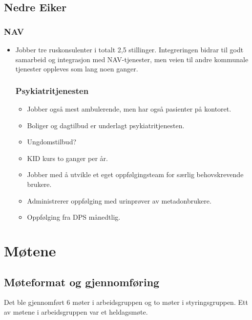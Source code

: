 \documentclass[11pt]{report} %
\begin{document}
                  \section{Nedre Eiker}\label{sec:org_nek}
                    \subsection{NAV}\label{sec:org_nek_nav}
                      \begin{itemize}
                      \item Jobber tre ruskonsulenter i totalt 2,5 stillinger. Integreringen bidrar til godt samarbeid og integrasjon med NAV-tjenester, men veien til andre kommunale tjenester oppleves som lang noen ganger. 
                    \subsection{Psykiatritjenesten}\label{sec:org_nek_psyk}  
                          \begin{itemize} 
                            \item Jobber også mest ambulerende, men har også pasienter på kontoret. 
                            \item Boliger og dagtilbud er underlagt psykiatritjenesten.
                            \item Ungdomstilbud?
                            \item KID kurs to ganger per år.
                            \item Jobber med å utvikle et eget oppfølgingsteam for særlig behovskrevende brukere. 
                            \item Administrerer oppfølging med urinprøver av metadonbrukere. 
                            \item Oppfølging fra DPS månedtlig.
                          \end{itemize}
                      \end{itemize}
                      



              \chapter{Møtene}\label{chap:m_main}
                \section{Møteformat og gjennomføring}\label{sec:m_form}
                  Det ble gjennomført 6 møter i arbeidsgruppen og to møter i styringsgruppen. Ett av møtene i arbeidsgruppen var et heldagsmøte.
\end{document}
